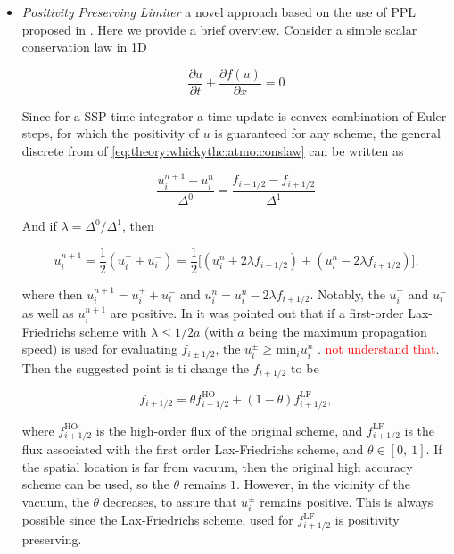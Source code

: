 \documentclass[11pt,a4paper,headinclude=true,DIV=14,BCOR=8mm,chapterprefix,listof=totoc,twoside,openright,abstracton]{scrbook}
\begin{document}
\begin{itemize}
\begin{itemize}
        \item \textit{Positivity Preserving Limiter} a novel approach based on the use of PPL proposed in \cite{Hu:2013}. Here we provide a brief overview. 
        Consider a simple scalar conservation law in 1D
        
        \begin{equation}
            \frac{\partial u}{\partial t} + \frac{\partial f(u)}{\partial x} = 0
            \label{eq:theory:whickythc:atmo:conslaw}
        \end{equation}

        Since for a SSP time integrator a time update is convex combination of Euler steps, for which the positivity of $u$ is guaranteed for any scheme, the general discrete from of \ref{eq:theory:whickythc:atmo:conslaw} can be written as 
        
        \begin{equation}
            \frac{u_{i}^{n+1} - u_{i}^{n}}{\Delta^0} = \frac{f_{i-1/2} - f_{i+1/2}}{\Delta^1}
        \end{equation}
        
        And if $\lambda = \Delta^0/\Delta^1$, then 
        
        \begin{equation}
            u_{i}^{n+1} = \frac{1}{2}(u_{i}^{+} + u_{i}^{-}) = \frac{1}{2}\Big[ (u_{i}^{n} + 2\lambda f_{i-1/2}) + (u_{i}^{n} - 2\lambda f_{i+1/2})\Big].
        \end{equation}
        
        where then $u_{i}^{n+1} = u_{i}^{+} + u_{i}^{-}$ and $u_{i}^{n} = u_{i}^{n} - 2\lambda f_{i+1/2}$. Notably, the $u_{i}^{+}$ and $u_{i}^{-}$ as well as $u_{i}^{n+1}$ are positive. In \cite{Hu:2013} it was pointed out that if a first-order Lax-Friedrichs scheme with $\lambda\leq 1/2a$ (with $a$ being the maximum propagation speed) is used for evaluating $f_{i\pm 1/2}$, the $u_{i}^{\pm}\geq \text{min}_i u_{i}^{n}$ \cite{Zhang:2010}. \textcolor{red}{not understand that}. Then the suggested point is ti change the $f_{i+1/2}$ to be 
        
        \begin{equation}
            f_{i+1/2} = \theta f_{i+1/2}^{\text{HO}} + (1-\theta)f_{i+1/2}^{\text{LF}},
        \end{equation}
        
        where $f_{i+1/2}^{\text{HO}}$ is the high-order flux of the original scheme, and $f_{i+1/2}^{\text{LF}}$ is the flux associated with the first order Lax-Friedrichs scheme, and $\theta\in[0,\:1]$. If the spatial location is far from vacuum, then the original high accuracy scheme can be used, so the $\theta$ remains $1$. However, in the vicinity of the vacuum, the $\theta$ decreases, to assure that $u_{i}^{\pm}$ remains positive. This is always possible since the Lax-Friedrichs scheme, used for $f_{i+1/2}^{\text{LF}}$ is positivity preserving.
        

\end{itemize}
\end{itemize}
\end{document}
